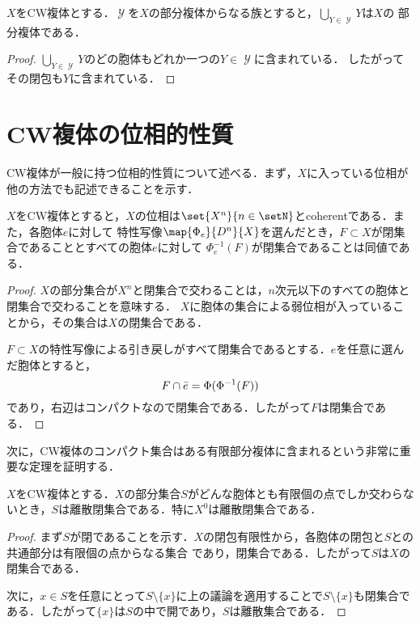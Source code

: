 \documentclass[uplatex]{jsarticle}
\newcommand{\setinverse}[2]{#1 ^{-1}(#2)}
\begin{document}
\begin{lemma}\label{subcomplex union}
  $X$をCW複体とする．$\mscrY$を$X$の部分複体からなる族とすると，$\bigcup_{Y\in \mscrY} Y$は$X$の
  部分複体である．
\end{lemma}

\begin{proof}
  $\bigcup_{Y\in \mscrY} Y$のどの胞体もどれか一つの$Y\in \mscrY$に含まれている．
  したがってその閉包も$Y$に含まれている．
\end{proof}

\section{CW複体の位相的性質}

CW複体が一般に持つ位相的性質について述べる．まず，$X$に入っている位相が他の方法でも記述できることを示す．

\begin{proposition}
  $X$をCW複体とすると，$X$の位相は$\set{X^n}{n\in \setN}$とcoherentである．また，各胞体$e$に対して
  特性写像$\map{\Phi_e}{D^n}{X}$を選んだとき，$F\subset X$が閉集合であることとすべての胞体$e$に対して
  $\setinverse{\Phi_e}{F}$が閉集合であることは同値である．
\end{proposition}

\begin{proof}
  $X$の部分集合が$X^n$と閉集合で交わることは，$n$次元以下のすべての胞体と閉集合で交わることを意味する．
  $X$に胞体の集合による弱位相が入っていることから，その集合は$X$の閉集合である．

  $F\subset X$の特性写像による引き戻しがすべて閉集合であるとする．$e$を任意に選んだ胞体とすると，
  \[ F\cap \Bar{e} = \Phi(\setinverse{\Phi}{F}) \]
  であり，右辺はコンパクトなので閉集合である．したがって$F$は閉集合である．
\end{proof}

次に，CW複体のコンパクト集合はある有限部分複体に含まれるという非常に重要な定理を証明する．

\begin{lemma}\label{discrete}
  $X$をCW複体とする．$X$の部分集合$S$がどんな胞体とも有限個の点でしか交わらないとき，$S$は離散閉集合である．特に$X^0$は離散閉集合である．
\end{lemma}

\begin{proof}
  まず$S$が閉であることを示す．$X$の閉包有限性から，各胞体の閉包と$S$との共通部分は有限個の点からなる集合
  であり，閉集合である．したがって$S$は$X$の閉集合である．

  次に，$x\in S$を任意にとって$S\setminus \{x\}$に上の議論を適用することで$S\setminus \{x\}$も閉集合で
  ある．したがって$\{x\}$は$S$の中で開であり，$S$は離散集合である．
\end{proof}
\end{document}
